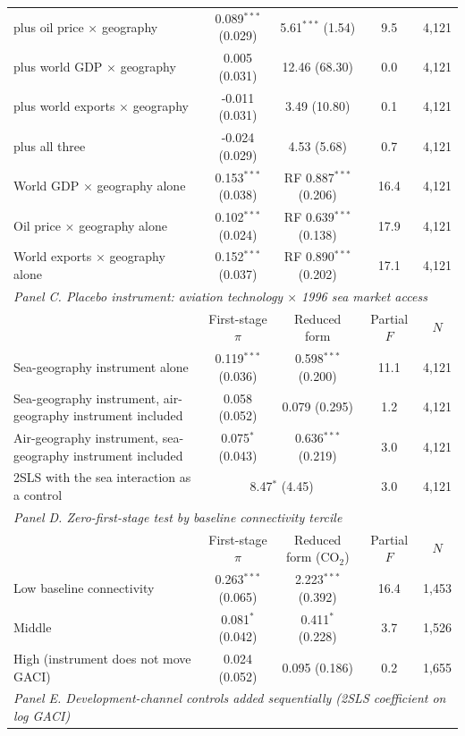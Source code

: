 \documentclass[12pt]{article}
\begin{document}
\begin{table}[H]
{\begin{threeparttable}
\begin{tabular}{lcccc}
  \quad plus oil price $\times$ geography & 0.089$^{***}$ (0.029) & 5.61$^{***}$ (1.54) & 9.5 & 4,121 \\
  \quad plus world GDP $\times$ geography & 0.005 (0.031) & 12.46 (68.30) & 0.0 & 4,121 \\
  \quad plus world exports $\times$ geography & -0.011 (0.031) & 3.49 (10.80) & 0.1 & 4,121 \\
  \quad plus all three & -0.024 (0.029) & 4.53 (5.68) & 0.7 & 4,121 \\
  World GDP $\times$ geography alone & 0.153$^{***}$ (0.038) & RF 0.887$^{***}$ (0.206) & 16.4 & 4,121 \\
  Oil price $\times$ geography alone & 0.102$^{***}$ (0.024) & RF 0.639$^{***}$ (0.138) & 17.9 & 4,121 \\
  World exports $\times$ geography alone & 0.152$^{***}$ (0.037) & RF 0.890$^{***}$ (0.202) & 17.1 & 4,121 \\
\midrule
\multicolumn{5}{l}{\textit{Panel C. Placebo instrument: aviation technology $\times$ 1996 sea market access}} \\
 & First-stage $\pi$ & Reduced form & Partial $F$ & $N$ \\
  Sea-geography instrument alone & 0.119$^{***}$ (0.036) & 0.598$^{***}$ (0.200) & 11.1 & 4,121 \\
  Sea-geography instrument, air-geography instrument included & 0.058 (0.052) & 0.079 (0.295) & 1.2 & 4,121 \\
  Air-geography instrument, sea-geography instrument included & 0.075$^{*}$ (0.043) & 0.636$^{***}$ (0.219) & 3.0 & 4,121 \\
  \quad 2SLS with the sea interaction as a control & \multicolumn{2}{c}{8.47$^{*}$ (4.45)} & 3.0 & 4,121 \\
\midrule
\multicolumn{5}{l}{\textit{Panel D. Zero-first-stage test by baseline connectivity tercile}} \\
 & First-stage $\pi$ & Reduced form (CO$_2$) & Partial $F$ & $N$ \\
  Low baseline connectivity & 0.263$^{***}$ (0.065) & 2.223$^{***}$ (0.392) & 16.4 & 1,453 \\
  Middle & 0.081$^{*}$ (0.042) & 0.411$^{*}$ (0.228) & 3.7 & 1,526 \\
  High (instrument does not move GACI) & 0.024 (0.052) & 0.095 (0.186) & 0.2 & 1,655 \\
\midrule
\multicolumn{5}{l}{\textit{Panel E. Development-channel controls added sequentially (2SLS coefficient on log GACI)}} \\

\end{tabular}
\end{threeparttable}}
\end{table}
\end{document}
